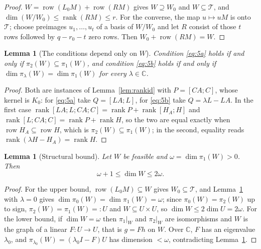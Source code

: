 \documentclass[journal]{IEEEtran}
\theoremstyle{plainn}
\newtheorem{lem}[thm]{Lemma}
\theoremstyle{remark}
\begin{document}
\begin{proof}
$W=\operatorname{row}(L_0M)+\operatorname{row}(RM)$ gives $W\supseteq W_0$ and
$W\subseteq\mathcal T$, and $\dim(W/W_0)\le\operatorname{rank}(RM)\le r$. For the converse, the
map $u\mapsto uM$ is onto $\mathcal T$; choose preimages $u_1,\dots,u_t$ of a basis of
$W/W_0$ and let $R$ consist of those $t$ rows followed by $q-r_0-t$ zero rows. Then
$W_0+\operatorname{row}(RM)=W$.
\end{proof}

\begin{lem}[The conditions depend only on $W$]\label{lem:W-conditions}
Condition \eqref{eq:5a} holds if and only if $\pi_2(W)\subseteq\pi_1(W)$, and condition
\eqref{eq:5b} holds if and only if $\dim\pi_\lambda(W)=\dim\pi_1(W)$ for every
$\lambda\in\mathbb C$.
\end{lem}

\begin{proof}
Both are instances of Lemma~\ref{lem:rankid} with $P=[CA;C]$, whose kernel is $K_0$: for
\eqref{eq:5a} take $Q=[LA;L]$, for \eqref{eq:5b} take $Q=\lambda L-LA$. In the first case
$\operatorname{rank}[LA;L;CA;C]=\operatorname{rank}P+\operatorname{rank}[H_A;H]$ and
$\operatorname{rank}[L;CA;C]=\operatorname{rank}P+\operatorname{rank}H$, so the two are equal
exactly when $\operatorname{row}H_A\subseteq\operatorname{row}H$, which is
$\pi_2(W)\subseteq\pi_1(W)$; in the second, equality reads
$\operatorname{rank}(\lambda H-H_A)=\operatorname{rank}H$.
\end{proof}

\begin{lem}[Structural bound]\label{lem:struct}
Let $W$ be feasible and $\omega=\dim\pi_1(W)>0$. Then
\begin{equation}\label{eq:struct}
\omega+1\le\dim W\le2\omega .
\end{equation}
\end{lem}

\begin{proof}
For the upper bound, $\operatorname{row}(L_0M)\subseteq W$ gives
$W_0\subseteq\mathcal T$, and Lemma~\ref{lem:W-conditions} with $\lambda=0$ gives
$\dim\pi_0(W)=\dim\pi_1(W)=\omega$; since $\pi_0(W)=\pi_2(W)$ up to sign,
$\pi_2(W)=\pi_1(W)=:U$ and $W\subseteq U\times U$, so $\dim W\le2\dim U=2\omega$. For the
lower bound, if $\dim W=\omega$ then $\pi_1|_W$ and $\pi_2|_W$ are isomorphisms and $W$ is the
graph of a linear $F:U\to U$, that is $g=Fh$ on $W$. Over $\mathbb C$, $F$ has an eigenvalue
$\lambda_0$, and $\pi_{\lambda_0}(W)=(\lambda_0I-F)U$ has dimension $<\omega$, contradicting
Lemma~\ref{lem:W-conditions}.
\end{proof}
\end{document}
